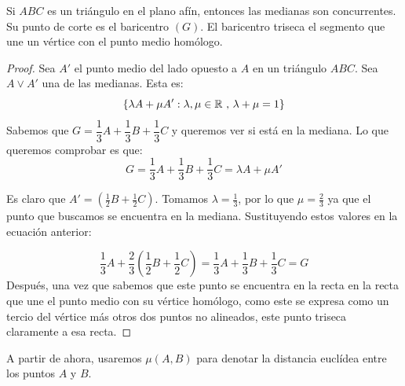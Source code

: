 \begin{ndef}
\begin{minipage}[]{0.27\textwidth}
\begin{center}
\end{center}

  \end{minipage}
\end{ndef}

\begin{nth}
  Si $ABC$ es un triángulo en el plano afín, entonces las medianas son concurrentes. Su punto de corte es el baricentro $(G)$. El baricentro triseca el segmento que une un vértice con el punto medio homólogo.


\end{nth}

\begin{proof}
  Sea $A'$ el punto medio del lado opuesto a $A$ en un triángulo $ABC$. Sea $A \vee A'$ una de las medianas. Esta es:
  \[
    \{\lambda A + \mu A': \lambda, \mu \in \mathbb{R} \text{ , } \lambda+\mu = 1\}
  \]
  Sabemos que $G = \dfrac{1}{3} A +  \dfrac{1}{3} B +  \dfrac{1}{3} C$ y queremos ver si está en la mediana. Lo que queremos comprobar es que:
  \[
    G = \dfrac{1}{3} A +  \dfrac{1}{3} B +  \dfrac{1}{3} C = \lambda A + \mu A'
  \]

  Es claro que $A' = \left(\frac{1}{2}B + \frac{1}{2}C\right)$. Tomamos $\lambda = \frac{1}{3}$, por lo que $\mu = \frac{2}{3}$ ya que el punto que buscamos se encuentra en la mediana. Sustituyendo estos valores en la ecuación anterior:

  $$\dfrac{1}{3}A + \dfrac{2}{3}\left(\dfrac{1}{2}B+\dfrac{1}{2}C\right) = \frac{1}{3}A + \frac{1}{3}B + \frac{1}{3}C = G$$
	Después, una vez que sabemos que este punto se encuentra en la recta en la recta que une el punto medio con su vértice homólogo, como este se expresa como un tercio del vértice más otros dos puntos no alineados, este punto triseca claramente a esa recta.
\end{proof}

\begin{nota}
  A partir de ahora, usaremos $\mu(A,B)$ para denotar la distancia euclídea entre los puntos $A$ y $B$.
\end{nota}

